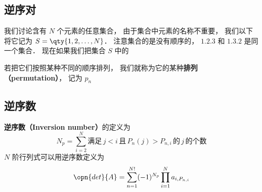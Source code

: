 

\subsection{逆序对}
我们讨论含有 $N$ 个元素的任意集合， 由于集合中元素的名称不重要， 我们以下将它记为 $S = \qty{1,2,\dots, N}$． 注意集合的是没有顺序的， $\qty{1,2,3}$ 和 $\qty{1,3,2}$ 是同一个集合． 现在如果我们把集合 $S$ 中的

若把它们按照某种不同的顺序排列， 我们就称为它的某种\textbf{排列（permutation）}， 记为 $p_n$

\subsection{逆序数}
\textbf{逆序数（Inversion number）}的定义为
\begin{equation}\label{InvNum_eq5}
N_p = \sum_{i=2}^N \text{满足}\, j<i \,\text{且}\, P_n(j) > P_{n,i} \, \text{的}\, j\, \text{的个数} 
\end{equation}
$N$ 阶行列式可以用逆序数定义为
\begin{equation}\label{InvNum_eq4}
\opn{det}{A} = \sum_{n=1}^{N!} (-1)^{N_p} \prod_{i=1}^N a_{i,P_{n,i}}
\end{equation}
